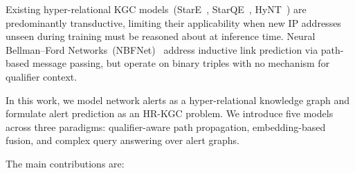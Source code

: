 \documentclass[10pt,journal,compsoc]{IEEEtran}
\begin{document}
Existing hyper-relational KGC models~(StarE~\cite{galkin2020message},
StarQE~\cite{alivanistos2021query}, HyNT~\cite{chung2023representation}) are
predominantly transductive, limiting their
applicability when new IP addresses unseen during
training must be reasoned about at inference time.
Neural Bellman--Ford Networks~(NBFNet)~\cite{zhu2021neural}
address inductive link prediction via path-based
message passing, but operate on binary triples with
no mechanism for qualifier context.

In this work, we model network alerts as a
hyper-relational knowledge graph and formulate alert
prediction as an HR-KGC problem. We introduce five
models across three paradigms: qualifier-aware
path propagation, embedding-based fusion, and
complex query answering over alert graphs.

\noindent The main contributions are:
\end{document}
